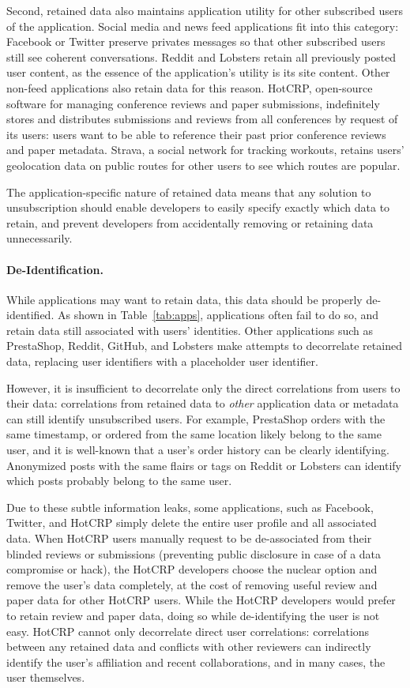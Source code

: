 Second, retained data also maintains application utility for other subscribed users of the
application. Social media and news feed applications fit into this category: Facebook or Twitter
preserve privates messages so that other subscribed users still see coherent conversations. Reddit
and Lobsters retain all previously posted user content, as the essence of the application's utility
is its site content.  Other non-feed applications also retain data for this reason. HotCRP,
open-source software for managing conference reviews and paper submissions, indefinitely stores and
distributes submissions and reviews from all conferences by request of its users: users want to be
able to reference their past prior conference reviews and paper metadata. Strava, a social network
for tracking workouts, retains users' geolocation data on public routes for other users to see which
routes are popular.

The application-specific nature of retained data means that any solution to unsubscription
should enable developers to easily specify exactly which data to retain, and prevent developers
from accidentally removing or retaining data unnecessarily.

\paragraph{De-Identification.}
While applications may want to retain data, this data should be properly de-identified. As shown in
Table~\ref{tab:apps}, applications often fail to do so, and retain data still associated
with users' identities. Other applications such as PrestaShop, Reddit, GitHub, and Lobsters make
attempts to decorrelate retained data, replacing user identifiers with a placeholder user identifier. 

However, it is insufficient to decorrelate only the direct correlations from users to their data:
correlations from retained data to \emph{other} application data or metadata can still identify
unsubscribed users. For example, PrestaShop orders with the same timestamp, or ordered from the same
location likely belong to the same user, and it is well-known that a user's order history can be
clearly identifying. Anonymized posts with the same flairs or tags on Reddit or Lobsters can
identify which posts probably belong to the same user. 

Due to these subtle information leaks, some applications, such as Facebook, Twitter, and HotCRP
simply delete the entire user profile and all associated data. When HotCRP users manually request to
be de-associated from their blinded reviews or submissions (preventing public disclosure in case of
a data compromise or hack), the HotCRP developers choose the nuclear option and remove the user's
data completely, at the cost of removing useful review and paper data for other HotCRP users.  While
the HotCRP developers would prefer to retain review and paper data, doing so while de-identifying
the user is not easy. HotCRP cannot only decorrelate direct user correlations: 
correlations between any retained data and conflicts with other reviewers can indirectly identify the user's
affiliation and recent collaborations, and in many cases, the user themselves.


